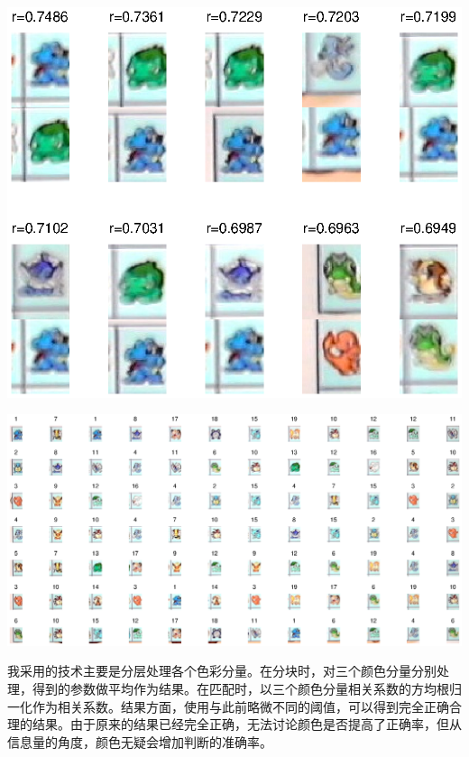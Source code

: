 \par \begin{center}\includegraphics[width=\textwidth]{A4_2_7_4.eps}\end{center}
\par \begin{center}\includegraphics[width=\textwidth]{A4_2_7_5.eps}\end{center}
\par 我采用的技术主要是分层处理各个色彩分量。在分块时，对三个颜色分量分别处理，得到的参数做平均作为结果。在匹配时，以三个颜色分量相关系数的方均根归一化作为相关系数。结果方面，使用与此前略微不同的阈值，可以得到完全正确合理的结果。由于原来的结果已经完全正确，无法讨论颜色是否提高了正确率，但从信息量的角度，颜色无疑会增加判断的准确率。

